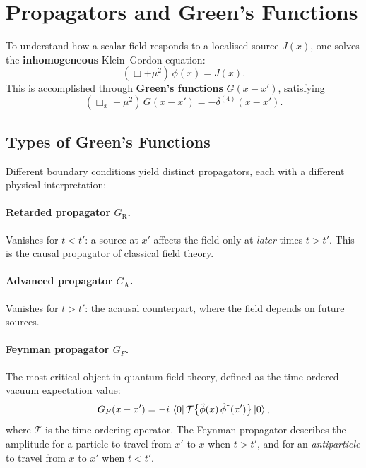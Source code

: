 \documentclass[12pt, a4paper]{article}
\theoremstyle{definition}
\begin{document}
\section{Propagators and Green's Functions}
\label{sec:propagators}

To understand how a scalar field responds to a localised source $J(x)$, one
solves the \textbf{inhomogeneous} Klein--Gordon equation:
\begin{equation}\label{eq:KG-inhomogeneous}
    (\Box + \mu^{2})\,\phi(x) = J(x).
\end{equation}
This is accomplished through \textbf{Green's functions} $G(x-x')$, satisfying
\begin{equation}\label{eq:greens-def}
    (\Box_{x} + \mu^{2})\,G(x-x') = -\delta^{(4)}(x-x').
\end{equation}

\subsection{Types of Green's Functions}

Different boundary conditions yield distinct propagators, each with a different
physical interpretation:

\paragraph{Retarded propagator $G_{\mathrm{R}}$.}
Vanishes for $t < t'$: a source at $x'$ affects the field only at
\emph{later} times $t > t'$.  This is the causal propagator of classical
field theory.

\paragraph{Advanced propagator $G_{\mathrm{A}}$.}
Vanishes for $t > t'$: the acausal counterpart, where the field depends on
future sources.

\paragraph{Feynman propagator $G_{F}$.}
The most critical object in quantum field theory, defined as the
time-ordered vacuum expectation value:
\begin{equation}\label{eq:feynman-prop-def}
    G_{F}(x-x')
    = -i\,\bra{0}\mathcal{T}\bigl\{
      \hat{\phi}(x)\,\hat{\phi}^{\dagger}(x')
    \bigr\}\ket{0},
\end{equation}
where $\mathcal{T}$ is the time-ordering operator.  The Feynman propagator
describes the amplitude for a particle to travel from $x'$ to $x$ when
$t > t'$, and for an \emph{antiparticle} to travel from $x$ to $x'$ when
$t < t'$.
\end{document}
